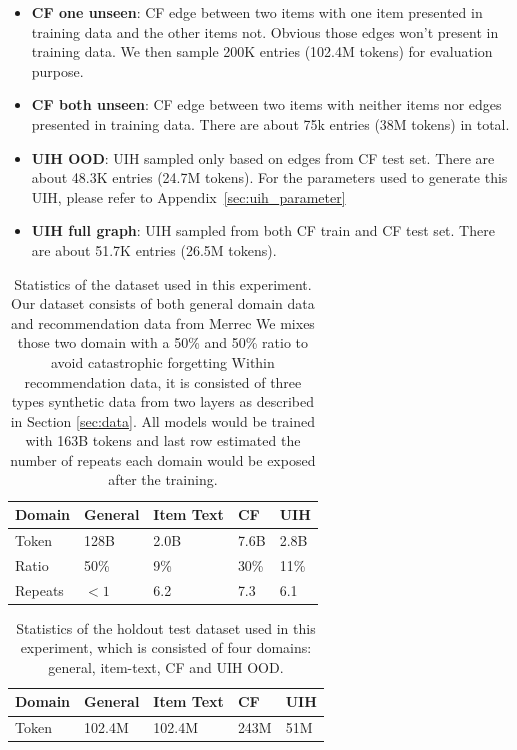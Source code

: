 \documentclass[]{fairmeta}
\begin{document}
\begin{itemize}
\begin{itemize}
    \item \textbf{CF one unseen}: CF edge between two items with one item presented in training data and the other items not. Obvious those edges won't present in training data. We then sample 200K entries (102.4M tokens) for evaluation purpose.
    \item \textbf{CF both unseen}: CF edge between two items with neither items nor edges presented in training data. There are about 75k entries (38M tokens) in total.
    \item \textbf{UIH OOD}: UIH sampled only based on edges from CF test set. There are about 48.3K entries (24.7M tokens). For the parameters used to generate this UIH, please refer to Appendix~\ref{sec:uih_parameter}
    \item \textbf{UIH full graph}: UIH sampled from both CF train and CF test set. There are about 51.7K entries (26.5M tokens).
\end{itemize}   

\end{itemize}

\begin{table}[]
\caption{Statistics of the dataset used in this experiment. Our dataset consists of both general domain data \cite{smollm2024} and recommendation data from Merrec \cite{merrec2024} We mixes those two domain with a 50\% and 50\% ratio to avoid catastrophic forgetting \cite{ibrahim2024simplescalablestrategiescontinually} Within recommendation data, it is consisted of three types synthetic data from two layers as described in Section \ref{sec:data}. All models would be trained with 163B tokens and last row estimated the number of repeats each domain would be exposed after the training.}
\label{tab:dataset}
\centering
\begin{tabular}{l|llll}
\toprule
Domain & General & Item Text & CF     & UIH    \\
\midrule
Token  & 128B    & 2.0B    & 7.6B & 2.8B \\
Ratio  & 50\%    & 9\%       & 30\%   & 11\%  \\
Repeats & $<1$ & 6.2 & 7.3 & 6.1 \\
\bottomrule
\end{tabular}
\end{table}

\begin{table}[]
\caption{Statistics of the holdout test dataset used in this experiment, which is consisted of four domains: general, item-text, CF and UIH OOD.}
\label{tab:test_dataset}
\centering
\begin{tabular}{l|llll}
\toprule
Domain & General & Item Text & CF     & UIH    \\
\midrule
Token  & 102.4M    & 102.4M    & 243M & 51M \\
\bottomrule
\end{tabular}
\end{table}
\end{document}
